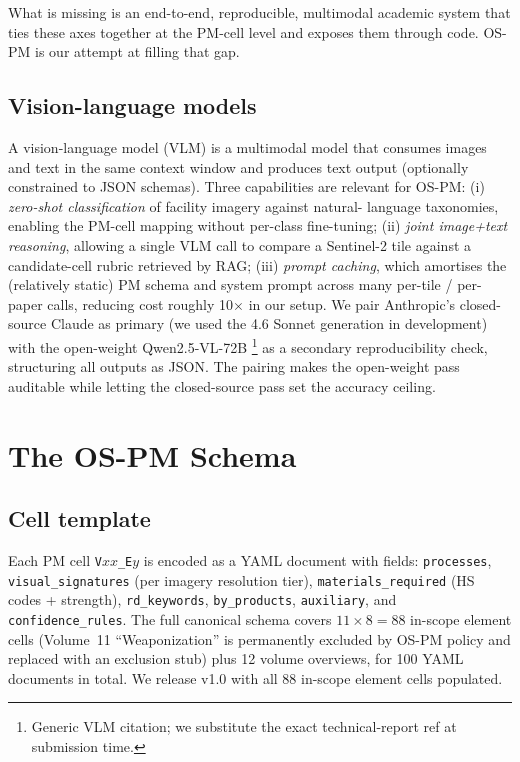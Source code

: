 \documentclass[11pt,a4paper]{article}
\newcommand{\pmcell}[1]{\texttt{#1}}
\begin{document}
What is missing is an end-to-end, reproducible, multimodal academic
system that ties these axes together at the PM-cell level and exposes
them through code. OS-PM is our attempt at filling that gap.

\subsection{Vision-language models}

A vision-language model (VLM) is a multimodal model that consumes
images and text in the same context window and produces text output
(optionally constrained to JSON schemas). Three capabilities are
relevant for OS-PM:
(i) \emph{zero-shot classification} of facility imagery against natural-
language taxonomies, enabling the PM-cell mapping without per-class
fine-tuning;
(ii) \emph{joint image+text reasoning}, allowing a single VLM call to
compare a Sentinel-2 tile against a candidate-cell rubric retrieved by
RAG;
(iii) \emph{prompt caching}, which amortises the (relatively static) PM
schema and system prompt across many per-tile / per-paper calls,
reducing cost roughly 10$\times$ in our setup.
We pair Anthropic's closed-source Claude as primary (we used the
4.6 Sonnet generation in development) with the open-weight Qwen2.5-VL-72B
\cite{QwenVL2025}\footnote{Generic VLM citation; we substitute the
exact technical-report ref at submission time.} as a secondary
reproducibility check, structuring all outputs as JSON. The pairing
makes the open-weight pass auditable while letting the closed-source
pass set the accuracy ceiling.

\section{The OS-PM Schema}\label{sec:schema}

\subsection{Cell template}
Each PM cell \pmcell{V$xx$\_E$y$} is encoded as a YAML document with
fields: \texttt{processes}, \texttt{visual\_signatures} (per imagery
resolution tier), \texttt{materials\_required} (HS codes + strength),
\texttt{rd\_keywords}, \texttt{by\_products}, \texttt{auxiliary}, and
\texttt{confidence\_rules}. The full canonical schema covers
$11 \times 8 = 88$ in-scope element cells (Volume~11 ``Weaponization''
is permanently excluded by OS-PM policy and replaced with an exclusion
stub) plus 12 volume overviews, for 100 YAML documents in total. We
release v1.0 with all 88 in-scope element cells populated.
\end{document}
